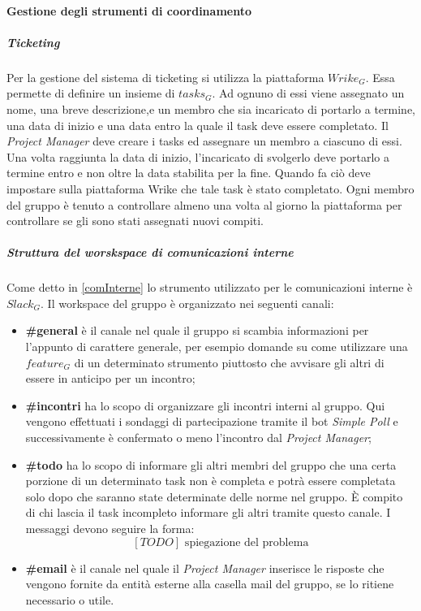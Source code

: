 		\paragraph{Gestione degli strumenti di coordinamento}
			\subparagraph{Ticketing} \Spazio
			Per la gestione del sistema di ticketing si utilizza la piattaforma $Wrike_G$. Essa permette di definire un insieme di $tasks_G$. Ad ognuno di essi viene assegnato un nome, una breve descrizione,e un membro che sia incaricato di portarlo a termine, una data di inizio e una data entro la quale il task deve essere completato. Il \emph{Project Manager} deve creare i tasks ed assegnare un membro a ciascuno di essi. Una volta raggiunta la data di inizio, l'incaricato di svolgerlo deve portarlo a termine entro e non oltre la data stabilita per la fine. Quando fa ciò deve impostare sulla piattaforma Wrike che tale task è stato completato. Ogni membro del gruppo è tenuto a controllare almeno una volta al giorno la piattaforma per controllare se gli sono stati assegnati nuovi compiti.
			
			\subparagraph{Struttura del worskspace di comunicazioni interne} \Spazio
			Come detto in \ref{comInterne} lo strumento utilizzato per le comunicazioni interne è $Slack_G$. Il workspace del gruppo è organizzato nei seguenti canali:
			\begin{itemize}
				\item \textbf{\#general} è il canale nel quale il gruppo si scambia informazioni per l'appunto di carattere generale, per esempio domande su come utilizzare una $feature_G$ di un determinato strumento piuttosto che avvisare gli altri di essere in anticipo per un incontro;
				\item \textbf{\#incontri} ha lo scopo di organizzare gli incontri interni al gruppo. Qui vengono effettuati i sondaggi di partecipazione tramite il bot \emph{Simple Poll} e successivamente è confermato o meno l'incontro dal \emph{Project Manager};
				\item \textbf{\#todo} ha lo scopo di informare gli altri membri del gruppo che una certa porzione di un determinato task non è completa e potrà essere completata solo dopo che saranno state determinate delle norme nel gruppo. È compito di chi lascia il task incompleto informare gli altri tramite questo canale. I messaggi devono seguire la forma:
						$$[TODO]\text{ spiegazione del problema}$$
				\item \textbf{\#email} è il canale nel quale il \emph{Project Manager} inserisce le risposte che vengono fornite da entità esterne alla casella mail del gruppo, se lo ritiene necessario o utile.
			\end{itemize}
			
